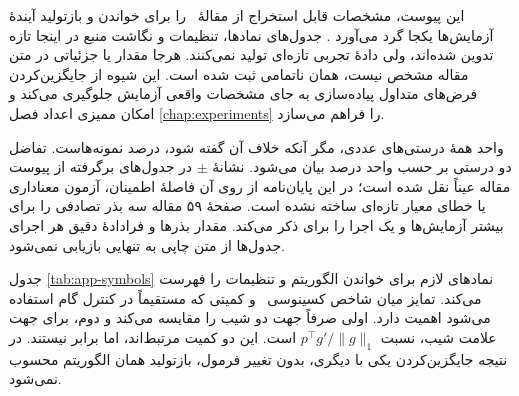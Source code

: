 \label{chap:technical-appendix}

این پیوست، مشخصات قابل استخراج از مقالهٔ \sora\ را برای خواندن و بازتولید آیندهٔ آزمایش‌ها یکجا گرد می‌آورد \cite{sora2026}. جدول‌های نمادها، تنظیمات و نگاشت منبع در اینجا تازه تدوین شده‌اند، ولی دادهٔ تجربی تازه‌ای تولید نمی‌کنند. هرجا مقدار یا جزئیاتی در متن مقاله مشخص نیست، همان ناتمامی ثبت شده است. این شیوه از جایگزین‌کردن فرض‌های متداول پیاده‌سازی به جای مشخصات واقعی آزمایش جلوگیری می‌کند و امکان ممیزی اعداد فصل \ref{chap:experiments} را فراهم می‌سازد.

واحد همهٔ درستی‌های عددی، مگر آنکه خلاف آن گفته شود، درصد نمونه‌هاست. تفاضل دو درستی بر حسب واحد درصد بیان می‌شود. نشانهٔ $\pm$ در جدول‌های برگرفته از پیوست مقاله عیناً نقل شده است؛ در این پایان‌نامه از روی آن فاصلهٔ اطمینان، آزمون معناداری یا خطای معیار تازه‌ای ساخته نشده است. صفحهٔ ۵۹ مقاله سه بذر تصادفی را برای بیشتر آزمایش‌ها و یک اجرا را برای  ذکر می‌کند. مقدار بذرها و فرادادهٔ دقیق هر اجرای جدول‌ها از متن چاپی به تنهایی بازیابی نمی‌شود.

جدول \ref{tab:app-symbols} نمادهای لازم برای خواندن الگوریتم و تنظیمات را فهرست می‌کند. تمایز میان شاخص کسینوسی \pertalign\ و کمیتی که مستقیماً در کنترل گام استفاده می‌شود اهمیت دارد. اولی صرفاً جهت دو شیب را مقایسه می‌کند و دوم، برای جهت علامت شیب، نسبت $p^\top g'/\|g\|_1$ است. این دو کمیت مرتبط‌اند، اما برابر نیستند. در نتیجه جایگزین‌کردن یکی با دیگری، بدون تغییر فرمول، بازتولید همان الگوریتم محسوب نمی‌شود.

